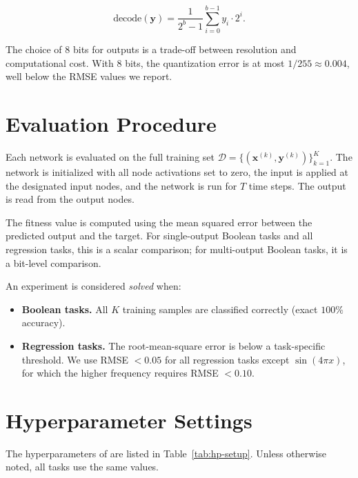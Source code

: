 \begin{equation}
  \text{decode}(\mathbf{y}) =
    \frac{1}{2^b - 1} \sum_{i=0}^{b-1} y_i \cdot 2^i.
  \label{eq:decode}
\end{equation}

The choice of $8$ bits for outputs is a trade-off between resolution
and computational cost. With $8$ bits, the quantization error is at
most $1/255 \approx 0.004$, well below the RMSE values we report.

\section{Evaluation Procedure}
\label{sec:exp-eval}

Each network is evaluated on the full training set
$\mathcal{D} = \{(\mathbf{x}^{(k)}, \mathbf{y}^{(k)})\}_{k=1}^{K}$.
The network is initialized with all node activations set to zero, the
input is applied at the designated input nodes, and the network is run
for $T$ time steps. The output is read from the output nodes.

The fitness value is computed using the mean squared error between
the predicted output and the target. For single-output Boolean tasks
and all regression tasks, this is a scalar comparison; for
multi-output Boolean tasks, it is a bit-level comparison.

An experiment is considered \emph{solved} when:

\begin{itemize}
  \item \textbf{Boolean tasks.} All $K$ training samples are classified
    correctly (exact $100\%$ accuracy).
  \item \textbf{Regression tasks.} The root-mean-square error is below
    a task-specific threshold. We use RMSE $< 0.05$ for all regression
    tasks except $\sin(4\pi x)$, for which the higher frequency
    requires RMSE $< 0.10$.
\end{itemize}

\section{Hyperparameter Settings}
\label{sec:exp-hp}

The hyperparameters of \modnet{} are listed in
Table~\ref{tab:hp-setup}. Unless otherwise noted, all tasks use the
same values.

